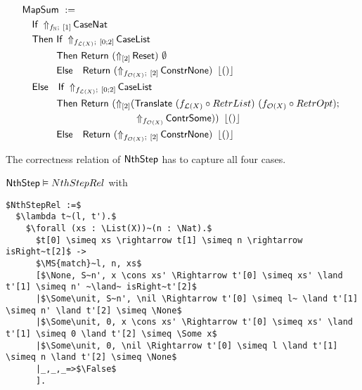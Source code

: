 \begin{definition}
  \label{def:Nth_Step}
  ~
  \begin{align*}
    & \MS{MapSum}~:= \\
    &\quad \MS{If}~\LiftBoth{\MS{CaseNat}}{f_\Nat}{\Vector{1}} \\
    &\quad \MS{Then}~ \MS{If}~\LiftBoth{\MS{CaseList}}{f_{\List(X)}}{\Vector{0;2}} \\
    &\quad \phantom{\MS{Then}}~\MS{Then}~   \Return{(\LiftTapes{\MS{Reset}}{\Vector{2}})}{\None} \\
    &\quad \phantom{\MS{Then}}~\MS{Else}~~~ \Return{(\LiftBoth{\MS{ConstrNone}}{f_{\Option(X)}}{\Vector{2}})}{\Some\unit} \\
    &\quad \MS{Else}~~~ \MS{If}~\LiftBoth{\MS{CaseList}}{f_{\List(X)}}{\Vector{0;2}} \\
    &\quad \phantom{\MS{Then}}~\MS{Then}~   \Return{(\LiftTapes{(\MS{Translate}~(f_{\List(X)} \circ RetrList)~(f_{\Option(X)} \circ RetrOpt) \Seq \\
    &\quad \phantom{\phantom{\MS{Then}}~\MS{Then}~\MS{Return}}\quad\quad~~ \LiftAlphabet{\MS{ContrSome}}{f_{\Option(X)}})}{\Vector{2}})}{\Some\unit} \\
    &\quad \phantom{\MS{Then}}~\MS{Else}~~~ \Return{(\LiftBoth{\MS{ConstrNone}}{f_{\Option(X)}}{\Vector{2}})}{\Some\unit}
  \end{align*}
\end{definition}

The correctness relation of $\mathsf{NthStep}$ has to capture all four cases.

\begin{lemma}
  \label{lem:Nth_Step_Realise}
  $\mathsf{NthStep} \mathrel{\vDash} NthStepRel$ with
  \small
\begin{lstlisting}[style=semicoqstyle]
$NthStepRel :=$
  $\lambda t~(l, t').$
    $\forall (xs : \List(X))~(n : \Nat).$
      $t[0] \simeq xs \rightarrow t[1] \simeq n \rightarrow isRight~t[2]$ ->
      $\MS{match}~l, n, xs$
      [$\None, S~n', x \cons xs' \Rightarrow t'[0] \simeq xs' \land t'[1] \simeq n' ~\land~ isRight~t'[2]$
      |$\Some\unit, S~n', \nil \Rightarrow t'[0] \simeq l~ \land t'[1] \simeq n' \land t'[2] \simeq \None$
      |$\Some\unit, 0, x \cons xs' \Rightarrow t'[0] \simeq xs' \land t'[1] \simeq 0 \land t'[2] \simeq \Some x$
      |$\Some\unit, 0, \nil \Rightarrow t'[0] \simeq l \land t'[1] \simeq n \land t'[2] \simeq \None$
      |_,_,_=>$\False$
      ].
\end{lstlisting}
\end{lemma}

